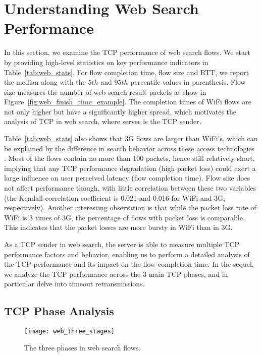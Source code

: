 
\section{Understanding Web Search Performance}
\label{sec:web_search}

In this section, we examine the TCP performance of web search flows. We start by providing high-level statistics on key performance indicators in Table~\ref{tab:web_stats}. For flow completion time, flow size and RTT, we report the median along with the $5th$ and $95th$ percentile values in parenthesis. Flow size measures the number of web search result packets as show in Figure~\ref{fig:web_finish_time_example}. The completion times of WiFi flows are not only higher but have a significantly higher spread, which motivates the analysis of TCP in web search, where server is the TCP sender. 


Table~\ref{tab:web_stats} also shows that 3G flows are larger than WiFi's, which can be explained by the difference in search behavior across these access technologies \cite{Song:2013:EEU:2488388.2488493}. Most of the flows contain no more than 100 packets, hence still relatively short, implying that any TCP performance degradation (\eg high packet loss) could exert a large influence on user perceived latency (\ie flow completion time). Flow size does not affect performance though, with little correlation between these two variables (the Kendall correlation coefficient is 0.021 and 0.016 for WiFi and 3G, respectively). Another interesting observation is that while the packet loss rate of WiFi is 3 times of 3G, the percentage of flows with packet loss is comparable. This indicates that the packet losses are more bursty in WiFi than in 3G. 

As a TCP sender in web search, the server is able to measure multiple TCP performance factors and behavior, enabling us to perform a detailed analysis of the TCP performance and its impact on the flow completion time. In the sequel, we analyze the TCP performance across the 3 main TCP phases, and in particular delve into timeout retransmissions.

\subsection{TCP Phase Analysis}

\begin{figure}[th]
\centering
\texttt{[image: web\_three\_stages]}
\caption{The three phases in web search flows.}
\label{fig:web_three_stages}
\minsqueeze
\end{figure}

